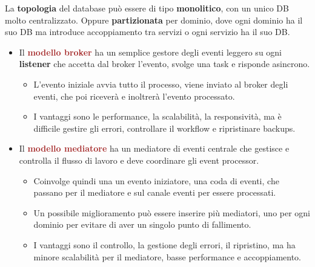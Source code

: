 \vspace*{0.02\textheight}
La \textbf{topologia} del database può essere di tipo \textbf{monolitico}, con un unico DB molto centralizzato. Oppure \textbf{partizionata} per dominio, dove ogni dominio ha il suo DB ma introduce accoppiamento tra servizi o ogni servizio ha il suo DB.
\begin{itemize}
    \item Il \textbf{\textcolor{brown}{modello broker}} ha un semplice gestore degli eventi leggero su ogni \textbf{listener} che accetta dal broker l'evento, svolge una task e risponde asincrono.
    \begin{itemize}
        \item L'evento iniziale avvia tutto il processo, viene inviato al broker degli eventi, che poi riceverà e inoltrerà l'evento processato.
        \item I vantaggi sono le performance, la scalabilità, la responsività, ma è difficile gestire gli errori, controllare il workflow e ripristinare backups.
    \end{itemize}
    \item Il \textbf{\textcolor{brown}{modello mediatore}} ha un mediatore di eventi centrale che gestisce e controlla il flusso di lavoro e deve coordinare gli event processor.
    \begin{itemize}
        \item Coinvolge quindi una un evento iniziatore, una coda di eventi, che passano per il mediatore e sul canale eventi per essere processati.
        \item Un possibile miglioramento può essere inserire più mediatori, uno per ogni dominio per evitare di aver un singolo punto di fallimento.
        \item I vantaggi sono il controllo, la gestione degli errori, il ripristino, ma ha minore scalabilità per il mediatore, basse performance e accoppiamento.
    \end{itemize}
\end{itemize}